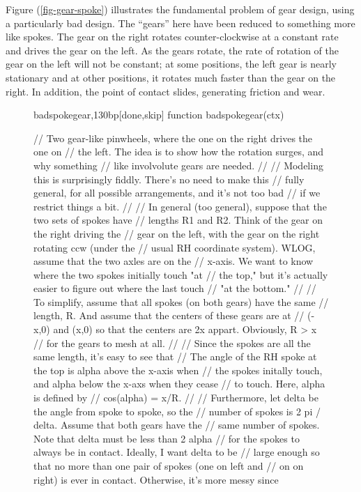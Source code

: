 \documentclass[10pt]{article}
\begin{document}
Figure (\ref{fig-gear-spoke}) illustrates the fundamental problem of
gear design, using a particularly bad design. The ``gears'' here have
been reduced to something more like spokes. The gear on the right
rotates counter-clockwise at a constant rate and drives the gear on
the left. As the gears rotate, the rate of rotation of the gear on the
left will not be constant; at some positions, the left gear is nearly
stationary and at other positions, it rotates much faster than the
gear on the right. In addition, the point of contact slides,
generating friction and wear. 

\begin{figure}
\begin{figput}{badspokegear,130bp}[done,skip]
function badspokegear(ctx) {
    
  // Two gear-like pinwheels, where the one on the right drives the one on 
  // the left. The idea is to show how the rotation surges, and why something
  // like involvolute gears are needed.
  //
  // Modeling this is surprisingly fiddly. There's no need to make this
  // fully general, for all possible arrangements, and it's not too bad
  // if we restrict things a bit.
  // 
  // In general (too general), suppose that the two sets of spokes have
  // lengths R1 and R2. Think of the gear on the right driving the
  // gear on the left, with the gear on the right rotating ccw (under the
  // usual RH coordinate system). WLOG, assume that the two axles are on the
  // x-axis. We want to know where the two spokes initially touch "at
  // the top," but it's actually easier to figure out where the last touch
  // "at the bottom."
  //
  // To simplify, assume that all spokes (on both gears) have the same
  // length, R. And assume that the centers of these gears are at
  // (-x,0) and (x,0) so that the centers are 2x appart. Obviously, R > x
  // for the gears to mesh at all.
  // 
  // Since the spokes are all the same length, it's easy to see that
  // The angle of the RH spoke at the top is alpha above the x-axis when
  // the spokes initally touch, and alpha below the x-axs when they cease
  // to touch. Here, alpha is defined by
  // cos(alpha) = x/R.
  //
  // Furthermore, let delta be the angle from spoke to spoke, so the
  // number of spokes is 2 pi / delta. Assume that both gears have the
  // same number of spokes. Note that delta must be less than 2 alpha
  // for the spokes to always be in contact. Ideally, I want delta to be
  // large enough so that no more than one pair of spokes (one on left and
  // on on right) is ever in contact. Otherwise, it's more messy since
}
\end{figput}
\end{figure}
\end{document}
